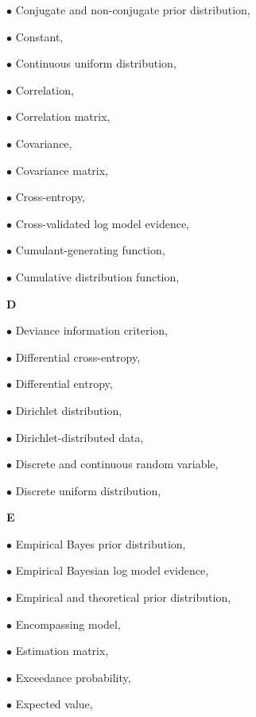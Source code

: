 \documentclass[a4paper,12pt,twoside]{book}
\begin{document}
$\bullet$ Conjugate and non-conjugate prior distribution, \pageref{sec:prior-conj}

$\bullet$ Constant, \pageref{sec:const}

$\bullet$ Continuous uniform distribution, \pageref{sec:cuni}

$\bullet$ Correlation, \pageref{sec:corr}

$\bullet$ Correlation matrix, \pageref{sec:corrmat}

$\bullet$ Covariance, \pageref{sec:cov}

$\bullet$ Covariance matrix, \pageref{sec:covmat}

$\bullet$ Cross-entropy, \pageref{sec:ent-cross}

$\bullet$ Cross-validated log model evidence, \pageref{sec:cvlme}

$\bullet$ Cumulant-generating function, \pageref{sec:cgf}

$\bullet$ Cumulative distribution function, \pageref{sec:cdf}


\vspace{1em}
\textbf{D}

$\bullet$ Deviance information criterion, \pageref{sec:dic}

$\bullet$ Differential cross-entropy, \pageref{sec:dent-cross}

$\bullet$ Differential entropy, \pageref{sec:dent}

$\bullet$ Dirichlet distribution, \pageref{sec:dir}

$\bullet$ Dirichlet-distributed data, \pageref{sec:dir-data}

$\bullet$ Discrete and continuous random variable, \pageref{sec:rvar-disc}

$\bullet$ Discrete uniform distribution, \pageref{sec:duni}


\vspace{1em}
\textbf{E}

$\bullet$ Empirical Bayes prior distribution, \pageref{sec:prior-eb}

$\bullet$ Empirical Bayesian log model evidence, \pageref{sec:eblme}

$\bullet$ Empirical and theoretical prior distribution, \pageref{sec:prior-emp}

$\bullet$ Encompassing model, \pageref{sec:encm}

$\bullet$ Estimation matrix, \pageref{sec:emat}

$\bullet$ Exceedance probability, \pageref{sec:prob-exc}

$\bullet$ Expected value, \pageref{sec:mean}
\end{document}
